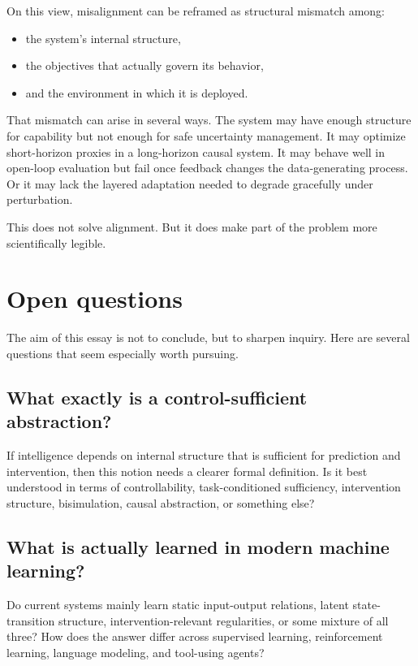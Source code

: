 \documentclass[11pt]{article}
\begin{document}
On this view, misalignment can be reframed as structural mismatch among:

\begin{itemize}
\item the system's internal structure,
\item the objectives that actually govern its behavior,
\item and the environment in which it is deployed.
\end{itemize}

That mismatch can arise in several ways. The system may have enough structure for capability but not enough for safe uncertainty management. It may optimize short-horizon proxies in a long-horizon causal system. It may behave well in open-loop evaluation but fail once feedback changes the data-generating process. Or it may lack the layered adaptation needed to degrade gracefully under perturbation.

This does not solve alignment. But it does make part of the problem more scientifically legible.

\section{Open questions}

The aim of this essay is not to conclude, but to sharpen inquiry. Here are several questions that seem especially worth pursuing.

\subsection{What exactly is a control-sufficient abstraction?}

If intelligence depends on internal structure that is sufficient for prediction and intervention, then this notion needs a clearer formal definition. Is it best understood in terms of controllability, task-conditioned sufficiency, intervention structure, bisimulation, causal abstraction, or something else?

\subsection{What is actually learned in modern machine learning?}

Do current systems mainly learn static input-output relations, latent state-transition structure, intervention-relevant regularities, or some mixture of all three? How does the answer differ across supervised learning, reinforcement learning, language modeling, and tool-using agents?
\end{document}
